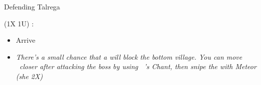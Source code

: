 \begin{battle}{Defending Talrega}
\begin{enumerate}
{\begin{itemize}
    \end{itemize}
    \item (1X 1U) \calill:
    \Xoff{\ike}
    \begin{itemize}
        \item Arrive
    \end{itemize}
}
\end{enumerate}
\vspace{2mm}
\begin{itemize}
    \item \textit{There’s a small chance that a  will block the bottom village. You can move \calill\ closer after attacking the boss by using \reyson\ 's Chant, then snipe the  with Meteor (she 2X)}
\end{itemize}
\end{battle}